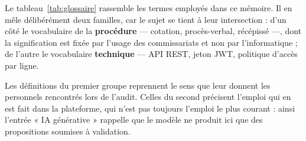 Le tableau~\ref{tab:glossaire} rassemble les termes employés dans ce mémoire. Il en mêle délibérément deux familles, car le sujet se tient à leur intersection : d'un côté le vocabulaire de la \textbf{procédure} — cotation, procès-verbal, récépissé —, dont la signification est fixée par l'usage des commissariats et non par l'informatique ; de l'autre le vocabulaire \textbf{technique} — API REST, jeton JWT, politique d'accès par ligne.

Les définitions du premier groupe reprennent le sens que leur donnent les personnels rencontrés lors de l'audit. Celles du second précisent l'emploi qui en est fait dans la plateforme, qui n'est pas toujours l'emploi le plus courant : ainsi l'entrée « IA générative » rappelle que le modèle ne produit ici que des propositions soumises à validation.

